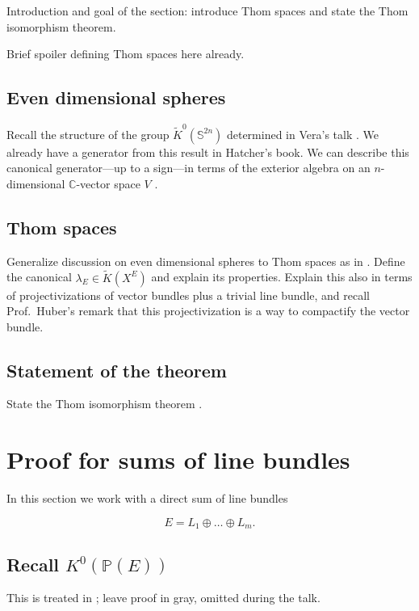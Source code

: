 \documentclass[12pt,a4paper]{amsart}
\theoremstyle{plain}
\theoremstyle{definition}
\theoremstyle{remark}
\begin{document}
Introduction and goal of the section: introduce Thom spaces and state the Thom isomorphism theorem.

Brief spoiler defining Thom spaces here already.

\subsection{Even dimensional spheres}

Recall the structure of the group $\tilde{K}^{0}(\mathbb{S}^{2n})$ determined in Vera's talk \cite[Corollary 2.12]{hat03}.
We already have a generator from this result in Hatcher's book.
We can describe this canonical generator---up to a sign---in terms of the exterior algebra on an $n$-dimensional $\mathbb{C}$-vector space $V$ \cite[p.~99]{ati67}.

\subsection{Thom spaces}

Generalize discussion on even dimensional spheres to Thom spaces as in \cite[p.~100]{ati67}.
Define the canonical $\lambda_{E} \in \tilde{K}(X^{E})$ and explain its properties.
Explain this also in terms of projectivizations of vector bundles plus a trivial line bundle, and recall Prof.~Huber's remark that this projectivization is a way to compactify the vector bundle.

\subsection{Statement of the theorem}

State the Thom isomorphism theorem \cite[Corollary 2.7.12]{ati67}.

\section{Proof for sums of line bundles}

In this section we work with a direct sum of line bundles

\[ E = L_{1} \oplus \ldots \oplus L_{m}. \]

\subsection{Recall $K^{0}(\mathbb{P}(E))$}

This is treated in \cite[Proposition 2.5.3]{ati67}; leave proof in gray, omitted during the talk.
\end{document}
